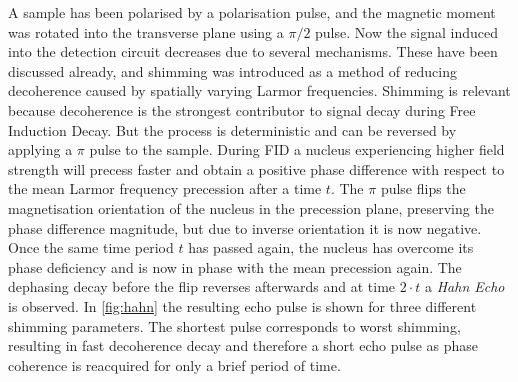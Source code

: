 \documentclass[
    parskip=half, 
    twoside=false,
    twocolumn=true,
    fontsize=11pt,
]{scrarticle}
\begin{document}
A sample has been polarised by a polarisation pulse, and the magnetic moment was rotated into the transverse plane using a $\pi/2$ pulse. Now the signal induced into the detection circuit decreases due to several mechanisms. These have been discussed already, and shimming was introduced as a method of reducing decoherence caused by spatially varying Larmor frequencies. Shimming is relevant because decoherence is the strongest contributor to signal decay during Free Induction Decay. But the process is deterministic and can be reversed by applying a $\pi$ pulse to the sample. During FID a nucleus experiencing higher field strength will precess faster and obtain a positive phase difference with respect to the mean Larmor frequency precession after a time $t$. The $\pi$ pulse flips the magnetisation orientation of the nucleus in the precession plane, preserving the phase difference magnitude, but due to inverse orientation it is now negative. Once the same time period $t$ has passed again, the nucleus has overcome its phase deficiency and is now in phase with the mean precession again. The dephasing decay before the flip reverses afterwards and at time $2\cdot t$ a \textit{Hahn Echo} is observed. In \autoref{fig:hahn} the resulting echo pulse is shown for three different shimming parameters. The shortest pulse corresponds to worst shimming, resulting in fast decoherence decay and therefore a short echo pulse as phase coherence is reacquired for only a brief period of time.
\end{document}
